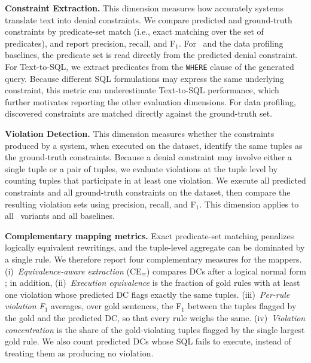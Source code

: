 \smallskip\noindent\textbf{Constraint Extraction.}
This dimension measures how accurately systems translate text into denial
constraints. We compare predicted and ground-truth constraints by
predicate-set match (i.e., exact matching over the set of predicates), and report precision, recall, and F$_1$. For \system\
and the data profiling baselines, the predicate set is read directly from the
predicted denial constraint. For Text-to-SQL, we extract predicates from the
\texttt{WHERE} clause of the generated query. Because different SQL
formulations may express the same underlying constraint, this metric can
underestimate Text-to-SQL performance, which further motivates reporting the
other evaluation dimensions. For data profiling, discovered constraints are
matched directly against the ground-truth set.

\smallskip\noindent\textbf{Violation Detection.}
This dimension measures whether the constraints produced by a system, when
executed on the dataset, identify the same tuples as the
ground-truth constraints. Because a denial constraint may involve either a
single tuple or a pair of tuples, we evaluate violations at the tuple level by
counting tuples that participate in at least one violation. We execute all predicted
constraints and all ground-truth constraints on the dataset, then compare the
resulting violation sets using precision, recall, and F$_1$. This dimension
applies to all \system\ variants and all baselines.


\smallskip\noindent\textbf{Complementary mapping metrics.}
Exact predicate-set matching penalizes logically equivalent rewritings, and the
tuple-level aggregate can be dominated by a single rule. We therefore report
four complementary measures for the mappers. (i)~\emph{Equivalence-aware
extraction} (CE$_{\equiv}$) compares DCs after a logical normal form ; in addition,
 (ii)~\emph{Execution equivalence} is the fraction of gold rules with at
least one violation whose predicted DC flags exactly the same tuples.
(iii)~\emph{Per-rule violation F$_1$} averages, over gold sentences, the F$_1$
between the tuples flagged by the gold and the predicted DC, so that every rule
weighs the same. (iv)~\emph{Violation concentration} is the share of the
gold-violating tuples flagged by the single largest gold rule\rem{; it is a property
of the dataset, not of the method}. We also count predicted DCs whose SQL fails
to execute, instead of treating them as producing no violation.


